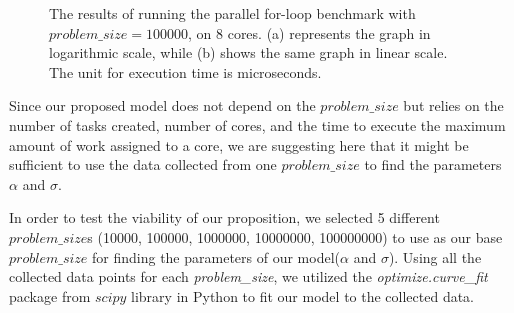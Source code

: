 \begin{figure}[H]
	\centering
	\caption{The results of running the parallel for-loop benchmark with $problem\_size=100000$, on 8 cores. (a) represents the graph in logarithmic scale, while (b) shows the same graph in linear scale. The unit for execution time is microseconds.}\label{fig60}		
\end{figure}

Since our proposed model does not depend on the $problem\_{size}$ but relies on the number of tasks created, number of cores, and the time to execute the maximum amount of work assigned to a core, we are suggesting here that it might be sufficient to use the data collected from one $problem\_{size}$ to find the parameters $\alpha$ and $\sigma$. 
 
In order to test the viability of our proposition, we selected 5 different $problem\_{size}$s (10000, 100000, 1000000, 10000000, 100000000) to use as our base $problem\_{size}$ for finding the parameters of our model($\alpha$ and $\sigma$). 
Using all the collected data points for each \emph{problem\_{size}}, we utilized the \emph{optimize.curve\_{fit}} package from $scipy$ library in Python to fit our model to the collected data.


